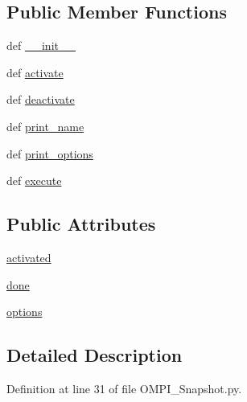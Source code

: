 \subsection*{Public Member Functions}
\begin{DoxyCompactItemize}
\item 
def \hyperlink{classOMPI__Snapshot_1_1OMPI__Snapshot_ab7795ea126dd1e33d4aa35e700fd0c14}{\-\_\-\-\_\-init\-\_\-\-\_\-}
\item 
def \hyperlink{classOMPI__Snapshot_1_1OMPI__Snapshot_a7adf04e52684ba6a4a9f0c2d9001bc4a}{activate}
\item 
def \hyperlink{classOMPI__Snapshot_1_1OMPI__Snapshot_a32a5364e9912d080292da1e56fe7f442}{deactivate}
\item 
def \hyperlink{classOMPI__Snapshot_1_1OMPI__Snapshot_ab7af9c3fc76ac8ac4a6776b40e50c9a6}{print\-\_\-name}
\item 
def \hyperlink{classOMPI__Snapshot_1_1OMPI__Snapshot_a7ce21ba8a546a75996c46e54196d51f4}{print\-\_\-options}
\item 
def \hyperlink{classOMPI__Snapshot_1_1OMPI__Snapshot_ae42ce34decdca8b8eb6a55f1fae6bce6}{execute}
\end{DoxyCompactItemize}
\subsection*{Public Attributes}
\begin{DoxyCompactItemize}
\item 
\hyperlink{classOMPI__Snapshot_1_1OMPI__Snapshot_a0e9ff636eea9c2e0593cc1e4f57c3b24}{activated}
\item 
\hyperlink{classOMPI__Snapshot_1_1OMPI__Snapshot_a6434d87ad221c54daecf11d8ad5604f8}{done}
\item 
\hyperlink{classOMPI__Snapshot_1_1OMPI__Snapshot_a1977ca5a7120bd199d1de101a0fb8c34}{options}
\end{DoxyCompactItemize}


\subsection{Detailed Description}


Definition at line 31 of file O\-M\-P\-I\-\_\-\-Snapshot.\-py.



